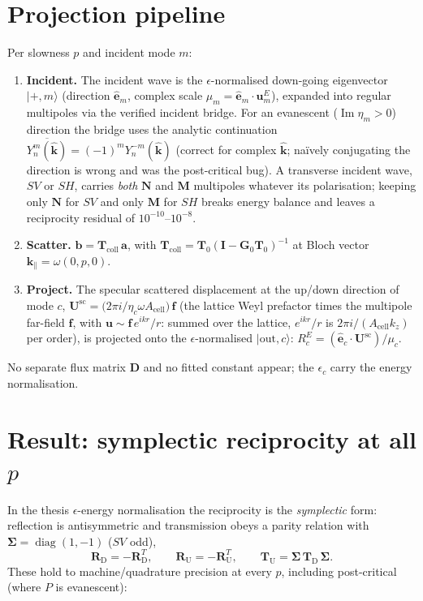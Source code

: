 \documentclass[11pt]{article}
\newcommand{\Rd}{\mathbf{R}_{\mathrm D}}
\newcommand{\Ru}{\mathbf{R}_{\mathrm U}}
\newcommand{\Td}{\mathbf{T}_{\mathrm D}}
\newcommand{\Tu}{\mathbf{T}_{\mathrm U}}
\begin{document}
\section{Projection pipeline}
Per slowness $p$ and incident mode $m$:
\begin{enumerate}
\item \textbf{Incident.} The incident wave is the $\epsilon$-normalised down-going eigenvector
  $\lvert+,m\rangle$ (direction $\hat{\mathbf e}_m$, complex scale $\mu_m=\hat{\mathbf e}_m\!\cdot\!\mathbf u^{E}_m$),
  expanded into regular multipoles via the verified incident bridge. For an evanescent
  ($\operatorname{Im}\eta_m>0$) direction the bridge uses the analytic continuation
  $\overline{Y_n^m(\hat{\mathbf k})}=(-1)^m Y_n^{-m}(\hat{\mathbf k})$ (correct for complex $\hat{\mathbf k}$;
  na\"ively conjugating the direction is wrong and was the post-critical bug). A transverse
  incident wave, $SV$ or $SH$, carries \emph{both} $\mathbf N$ and $\mathbf M$ multipoles whatever its
  polarisation; keeping only $\mathbf N$ for $SV$ and only $\mathbf M$ for $SH$ breaks energy balance
  and leaves a reciprocity residual of $10^{-10}$--$10^{-8}$.
\item \textbf{Scatter.} $\mathbf b=\mathbf{T}_{\mathrm{coll}}\,\mathbf a$, with
  $\mathbf{T}_{\mathrm{coll}}=\mathbf{T}_0(\mathbf I-\mathbf{G}_0\mathbf{T}_0)^{-1}$ at Bloch vector
  $\mathbf{k}_\parallel=\omega(0,p,0)$.
\item \textbf{Project.} The specular scattered displacement at the up/down direction of mode $c$,
  $\mathbf U^{\mathrm{sc}}=\bigl(2\pi i/\eta_c\omega A_{\mathrm{cell}}\bigr)\,\mathbf f$ (the lattice Weyl
  prefactor times the multipole far-field $\mathbf f$, with $\mathbf u\sim\mathbf f\,e^{ikr}/r$: summed over
  the lattice, $e^{ikr}/r$ is $2\pi i/(A_{\mathrm{cell}}k_z)$ per order), is projected onto the $\epsilon$-normalised
  $\lvert\mathrm{out},c\rangle$: $R^{E}_{c}=(\hat{\mathbf e}_c\!\cdot\!\mathbf U^{\mathrm{sc}})/\mu_c$.
\end{enumerate}
No separate flux matrix $\mathbf D$ and no fitted constant appear; the $\epsilon_c$ carry the energy
normalisation.

\section{Result: symplectic reciprocity at all $p$}
In the thesis $\epsilon$-energy normalisation the reciprocity is the \emph{symplectic} form: reflection
is antisymmetric and transmission obeys a parity relation with $\boldsymbol\Sigma=\operatorname{diag}(1,-1)$
($SV$ odd),
\begin{equation}
\Rd=-\Rd^{T},\qquad \Ru=-\Ru^{T},\qquad \Tu=\boldsymbol\Sigma\,\Td\,\boldsymbol\Sigma .
\end{equation}
These hold to machine/quadrature precision at every $p$, including post-critical (where $P$ is
evanescent):
\end{document}
